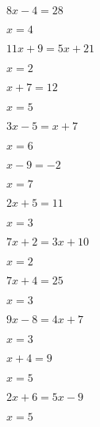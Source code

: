 \documentclass{ximera}
\begin{document}
\begin{exercise}
\begin{xmmulticols}
    \begin{question} \( 8x - 4  = 28       \) \begin{uitkomst} \( x = 4   \) \end{uitkomst} \end{question}
    \begin{question} \( 11x + 9 = 5x + 21  \) \begin{uitkomst} \( x = 2   \) \end{uitkomst} \end{question}
    \begin{question} \( x + 7   = 12       \) \begin{uitkomst} \( x = 5   \) \end{uitkomst} \end{question}
    \begin{question} \( 3x - 5  = x + 7    \) \begin{uitkomst} \( x = 6   \) \end{uitkomst} \end{question}
    \begin{question} \( x - 9   = -2       \) \begin{uitkomst} \( x = 7   \) \end{uitkomst} \end{question}
    \begin{question} \( 2x + 5  = 11       \) \begin{uitkomst} \( x = 3   \) \end{uitkomst} \end{question}
    \begin{question} \( 7x + 2  = 3x + 10  \) \begin{uitkomst} \( x  = 2  \) \end{uitkomst} \end{question} 
    \begin{question} \( 7x + 4  = 25       \) \begin{uitkomst} \( x  = 3  \) \end{uitkomst} \end{question}
    \begin{question} \( 9x - 8  = 4x + 7   \) \begin{uitkomst} \( x  = 3  \) \end{uitkomst} \end{question} 
    \begin{question} \( x + 4   = 9        \) \begin{uitkomst} \( x  = 5  \) \end{uitkomst} \end{question}
    \begin{question} \( 2x + 6  = 5x - 9   \) \begin{uitkomst} \( x  = 5  \) \end{uitkomst} \end{question} 
    
  \end{xmmulticols}
\end{exercise}  
    
\end{document}
